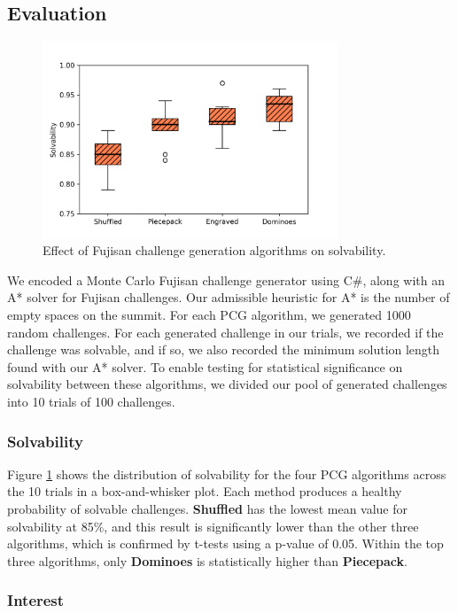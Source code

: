 \documentclass[journal]{IEEEtran}
\begin{document}
\subsection{Evaluation}

%


\begin{figure}[t]
\includegraphics[width=8.8cm]{figure16.png}
\caption{Effect of Fujisan challenge generation algorithms on solvability.}
\label{fig:strategycomp}
\end{figure}

\noindent
We encoded a Monte Carlo Fujisan challenge generator using C\#, along with an A* solver for Fujisan challenges. Our admissible heuristic for A* is the number of empty spaces on the summit. For each PCG algorithm, we generated 1000 random challenges.
For each generated challenge in our trials, we recorded if the challenge was solvable, and if so, we also recorded the minimum solution length found with our A* solver. To enable testing for statistical significance on solvability between these algorithms, we divided our pool of generated challenges into 10 trials of 100 challenges. 
 
\subsubsection{Solvability}

Figure \ref{fig:strategycomp} shows the distribution of solvability for the four PCG algorithms across the 10 trials in a box-and-whisker plot. Each method produces a healthy probability of solvable challenges. {\bf Shuffled} has the lowest mean value for solvability at 85\%, and this result is significantly lower than the other three algorithms, which is confirmed by t-tests using a p-value of 0.05. Within the top three algorithms, only {\bf Dominoes} is statistically higher than {\bf Piecepack}. 

\subsubsection{Interest}
\end{document}
